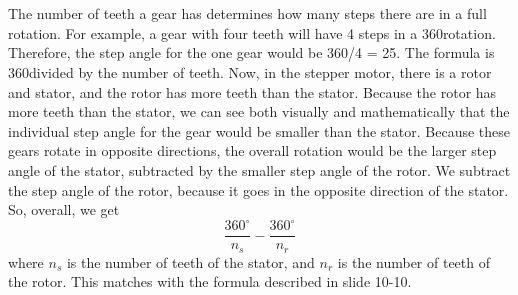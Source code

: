 \section{}
The number of teeth a gear has determines how many steps there are in a full
rotation. For example, a gear with four teeth will have 4 steps in a
360\textdegree rotation. Therefore, the step angle for the one gear would be
360\textdegree/4 = 25\textdegree. The formula is 360\textdegree divided by the
number of teeth. Now, in the stepper motor, there is a rotor and stator, and the
rotor has more teeth than the stator. Because the rotor has more teeth than the
stator, we can see both visually and mathematically that the individual step
angle for the gear would be smaller than the stator. Because these gears rotate
in opposite directions, the overall rotation would be the larger step angle of
the stator, subtracted by the smaller step angle of the rotor. We subtract the
step angle of the rotor, because it goes in the opposite direction of the
stator. So, overall, we get \[\frac{360^\circ}{n_s} - \frac{360^\circ}{n_r}\]
where \(n_s\) is the number of teeth of the stator, and \(n_r\) is the number of
teeth of the rotor. This matches with the formula described in slide 10-10.
